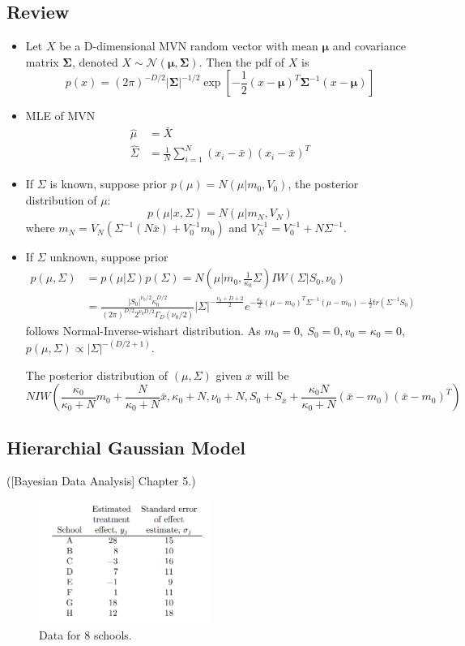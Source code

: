 \documentclass{harvardml}
\theoremstyle{definition}
\theoremstyle{plain}
\renewcommand{\v}[1]{\mathbf{#1}}
\begin{document}
\subsection{Review}
\begin{itemize}
\item Let $X$ be a D-dimensional MVN random vector with mean $\v\mu$ and covariance matrix $\v\Sigma$, denoted $X \sim \mathcal{N}\left(\v\mu,\v\Sigma\right)$. Then the pdf of $X$ is
$$ p(x) = \left(2\pi\right)^{-D/2} |\v\Sigma|^{-1/2} \exp{[-\frac{1}{2}(x-\v\mu)^T\v\Sigma^{-1}(x-\v\mu)]} $$
\item MLE of MVN
\begin{align*}
\hat \mu &=\bar X \\
\hat \Sigma &= \frac{1}{N}\sum_{i=1}^N(x_i - \bar x)(x_i - \bar x)^T
\end{align*}
\item If $\Sigma$ is known, suppose prior $p(\mu) = N(\mu|m_0, V_0)$, the posterior distribution of $\mu$: $$p(\mu| x, \Sigma) = N(\mu|m_N, V_N)$$
where $m_N  = V_N(\Sigma^{-1}(N\bar x) + V_0^{-1}m_0)$ and $ V_N^{-1} = V_0^{-1} + N\Sigma^{-1}$.
\item  If $\Sigma$ unknown, suppose prior 
\begin{align*}
p(\mu, \Sigma) &= p(\mu|\Sigma) p(\Sigma) = N(\mu|m_0, \frac{1}{\kappa_0}\Sigma) IW(\Sigma|S_0, \nu_0)  \\
&=  \frac{|S_0|^{\nu_0/2}\kappa_0^{D/2}}{(2\pi)^{D/2}2^{\nu_0D/2}\Gamma_D(\nu_0/2)}|\Sigma|^{-\frac{v_0 + D +2}{2}}e^{-\frac{\kappa_0}{2}(\mu - m_0)^T\Sigma^{-1}(\mu - m_0) - \frac12tr(\Sigma^{-1}S_0)}
\end{align*}
follows Normal-Inverse-wishart distribution. As $m_0 = 0,\ S_0 = 0, v_0 = \kappa_0 = 0 $, $p(\mu, \Sigma) \propto |\Sigma|^{-(D/2+1)}$.

The posterior distribution of $(\mu, \Sigma)$ given $x$ will be $$NIW(\frac{\kappa_0}{\kappa_0 + N} m_0 + \frac{N}{\kappa_0 + N} \bar x, \kappa_0 + N, \nu_0 + N, S_0 + S_{\bar x} + \frac{\kappa_0N}{\kappa_0 + N}(\bar x - m_0)(\bar x - m_0)^T)$$
\end{itemize}
\subsection{Hierarchial Gaussian Model}
([Bayesian Data Analysis] Chapter 5.) 
\begin{figure}[!hbt]
\center
\includegraphics[width=0.5\textwidth]{8school_data.pdf}
\caption{Data for 8 schools.}
\end{figure}
\end{document}
